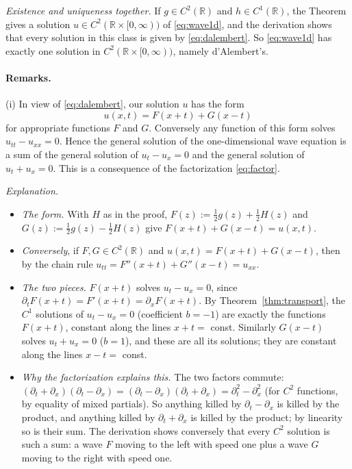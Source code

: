 \documentclass[11pt]{article}
\theoremstyle{plain}
\theoremstyle{definition}
\theoremstyle{remark}
\begin{document}
\emph{Existence and uniqueness together.} If $g \in C^2(\mathbb{R})$ and $h \in C^1(\mathbb{R})$, the Theorem gives a solution $u \in C^2(\mathbb{R}\times[0,\infty))$ of \eqref{eq:wave1d}, and the derivation shows that every solution in this class is given by \eqref{eq:dalembert}. So \eqref{eq:wave1d} has exactly one solution in $C^2(\mathbb{R}\times[0,\infty))$, namely d'Alembert's.

\paragraph{Remarks.}

(i) In view of \eqref{eq:dalembert}, our solution $u$ has the form
$$ u(x,t) = F(x + t) + G(x - t) $$
for appropriate functions $F$ and $G$. Conversely any function of this form solves $u_{tt} - u_{xx} = 0$. Hence the general solution of the one-dimensional wave equation is a sum of the general solution of $u_t - u_x = 0$ and the general solution of $u_t + u_x = 0$. This is a consequence of the factorization \eqref{eq:factor}.

\emph{Explanation.}
\begin{itemize}
    \item \emph{The form.} With $H$ as in the proof, $F(z) := \frac12 g(z) + \frac12 H(z)$ and $G(z) := \frac12 g(z) - \frac12 H(z)$ give $F(x + t) + G(x - t) = u(x,t)$.
    \item \emph{Conversely}, if $F, G \in C^2(\mathbb{R})$ and $u(x,t) = F(x + t) + G(x - t)$, then by the chain rule $u_{tt} = F''(x + t) + G''(x - t) = u_{xx}$.
    \item \emph{The two pieces.} $F(x + t)$ solves $u_t - u_x = 0$, since $\partial_t F(x + t) = F'(x + t) = \partial_x F(x + t)$. By Theorem~\ref{thm:transport}, the $C^1$ solutions of $u_t - u_x = 0$ (coefficient $b = -1$) are exactly the functions $F(x + t)$, constant along the lines $x + t = $ const. Similarly $G(x - t)$ solves $u_t + u_x = 0$ ($b = 1$), and these are all its solutions; they are constant along the lines $x - t = $ const.
    \item \emph{Why the factorization explains this.} The two factors commute: $(\partial_t + \partial_x)(\partial_t - \partial_x) = (\partial_t - \partial_x)(\partial_t + \partial_x) = \partial_t^2 - \partial_x^2$ (for $C^2$ functions, by equality of mixed partials). So anything killed by $\partial_t - \partial_x$ is killed by the product, and anything killed by $\partial_t + \partial_x$ is killed by the product; by linearity so is their sum. The derivation shows conversely that every $C^2$ solution is such a sum: a wave $F$ moving to the left with speed one plus a wave $G$ moving to the right with speed one.
\end{itemize}
\end{document}
